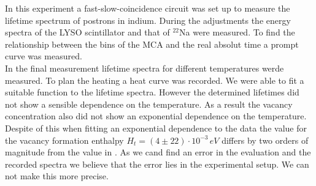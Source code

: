 In this experiment a fast-slow-coincidence circuit was set up to measure the lifetime spectrum of postrons in indium. During the adjustments the energy spectra of the LYSO scintillator and that of $^{22}$Na were measured. To find the relationship between the bins of the MCA and the real absolut time a prompt curve was measured. \\

In the final measurement lifetime spectra for different temperatures werde measured. To plan the heating a heat curve was recorded. We were able to fit a suitable function to the lifetime spectra. However the determined lifetimes did not show a sensible dependence on the temperature. As a result the vacancy concentration also did not show an exponential dependence on the temperature. Despite of this when fitting an exponential dependence to the data the value for the vacancy formation enthalpy $H_t = (4 \pm 22) \cdot 10^{-3}\,\si{eV}$ differs by two orders of magnitude from the value in \cite{weiler}. As we cand find an error in the evaluation and the recorded spectra we believe that the error lies in the experimental setup. We can not make this more precise.
